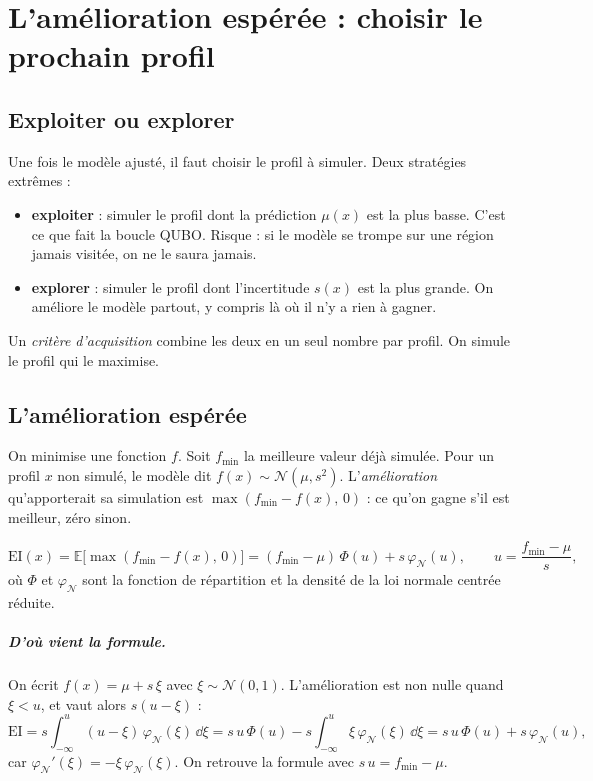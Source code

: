 \chapter{L'amélioration espérée : choisir le prochain profil}\label{ch:acquisition}

\section{Exploiter ou explorer}
Une fois le modèle ajusté, il faut choisir le profil à simuler. Deux stratégies extrêmes :
\begin{itemize}
\item \textbf{exploiter} : simuler le profil dont la prédiction $\mu(x)$ est la plus basse. C'est ce que fait la boucle QUBO. Risque : si le modèle se trompe sur une région jamais visitée, on ne le saura jamais.
\item \textbf{explorer} : simuler le profil dont l'incertitude $s(x)$ est la plus grande. On améliore le modèle partout, y compris là où il n'y a rien à gagner.
\end{itemize}
Un \emph{critère d'acquisition} combine les deux en un seul nombre par profil. On simule le profil qui le maximise.

\section{L'amélioration espérée}
On minimise une fonction $f$. Soit $f_{\min}$ la meilleure valeur déjà simulée. Pour un profil $x$ non simulé, le modèle dit $f(x)\sim\mathcal N(\mu,s^2)$. L'\emph{amélioration} qu'apporterait sa simulation est $\max(f_{\min}-f(x),\,0)$ : ce qu'on gagne s'il est meilleur, zéro sinon.

\begin{definition}
\[
\mathrm{EI}(x)=\mathbb E\big[\max(f_{\min}-f(x),\,0)\big]
=(f_{\min}-\mu)\,\Phi(u)+s\,\varphi_{\mathcal N}(u),\qquad u=\frac{f_{\min}-\mu}{s},
\]
où $\Phi$ et $\varphi_{\mathcal N}$ sont la fonction de répartition et la densité de la loi normale centrée réduite.
\end{definition}

\paragraph{D'où vient la formule.} On écrit $f(x)=\mu+s\,\xi$ avec $\xi\sim\mathcal N(0,1)$. L'amélioration est non nulle quand $\xi<u$, et vaut alors $s(u-\xi)$ :
\[
\mathrm{EI}=s\int_{-\infty}^{u}(u-\xi)\,\varphi_{\mathcal N}(\xi)\,\dd\xi
=s\,u\,\Phi(u)-s\int_{-\infty}^{u}\xi\,\varphi_{\mathcal N}(\xi)\,\dd\xi
=s\,u\,\Phi(u)+s\,\varphi_{\mathcal N}(u),
\]
car $\varphi_{\mathcal N}'(\xi)=-\xi\,\varphi_{\mathcal N}(\xi)$. On retrouve la formule avec $s\,u=f_{\min}-\mu$.

